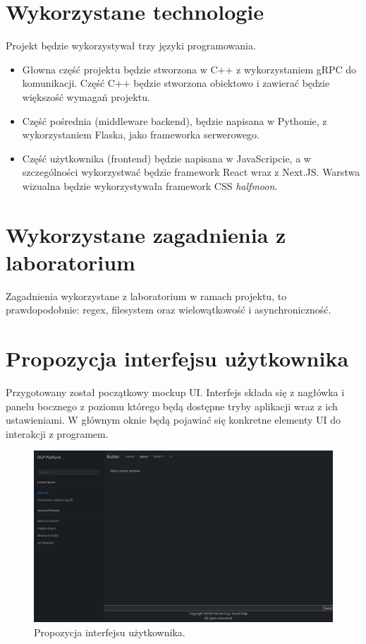 \documentclass{article}
\begin{document}
\section{Wykorzystane technologie}

Projekt będzie wykorzystywał trzy języki programowania. 

\begin{itemize}
  \item Głowna część projektu będzie stworzona w C++ z wykorzystaniem gRPC do komunikacji. Część C++ będzie stworzona obiektowo i zawierać będzie większość wymagań projektu. 
  \item Część pośrednia (middleware backend), będzie napisana w Pythonie, z wykorzystaniem Flaska, jako frameworka serwerowego. 
  \item Część użytkownika (frontend) będzie napisana w JavaScripcie, a w szczególności wykorzystwać będzie framework React wraz z Next.JS. Warstwa wizualna będzie wykorzystywała framework CSS \textit{halfmoon}. 
\end{itemize}

\section{Wykorzystane zagadnienia z laboratorium}

Zagadnienia wykorzystane z laboratorium w ramach projektu, to prawdopodobnie: regex, filesystem oraz wielowątkowość i asynchroniczność.

\section{Propozycja interfejsu użytkownika}

Przygotowany został początkowy mockup UI. 
Interfejs składa się z nagłówka i panelu bocznego z poziomu którego będą dostępne tryby aplikacji wraz z ich ustawieniami. W głównym oknie będą pojawiać się konkretne elementy UI do interakcji z programem.

\begin{figure}
\centering
  \includegraphics[width=1\linewidth]{ui_mockup.png}
  \caption{\label{fig:ui mockup}Propozycja interfejsu użytkownika.}
\end{figure}
\end{document}
